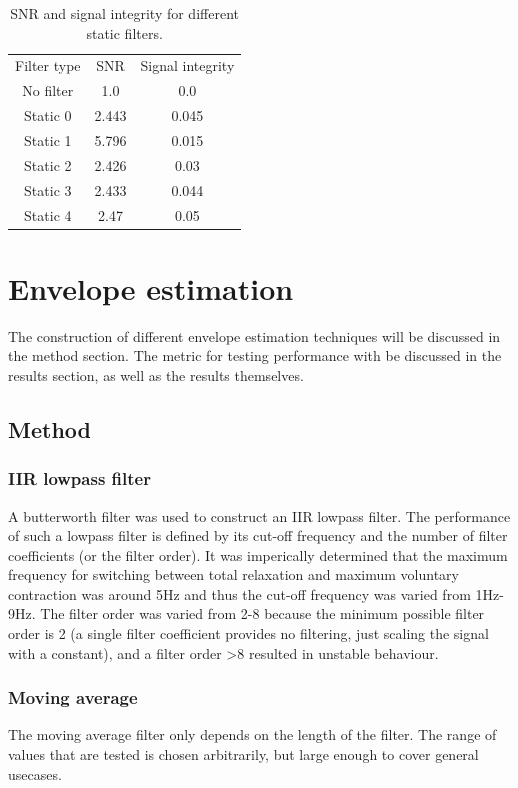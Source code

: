 \begin{table} [h!]
    \begin{tabular}{c|c|c}
        Filter type & SNR & Signal integrity\\
        No filter & 1.0 & 0.0\\
        Static 0 & 2.443 & 0.045\\
        Static 1 & 5.796 & 0.015\\
        Static 2 & 2.426 & 0.03\\
        Static 3 & 2.433 & 0.044\\
        Static 4 & 2.47 & 0.05\\
    \end{tabular}
    \caption{SNR and signal integrity for different static filters.}
    \label{tab:static_filter_snr_integrity}
\end{table}

\section{Envelope estimation}
The construction of different envelope estimation techniques will be discussed in the method section. The metric for testing performance with be discussed in the results section, as well as the results themselves.

\subsection{Method}
\subsubsection{IIR lowpass filter}
A butterworth filter was used to construct an IIR lowpass filter. The performance of such a lowpass filter is defined by its cut-off frequency and the number of filter coefficients (or the filter order). It was imperically determined that the maximum frequency for switching between total relaxation and maximum voluntary contraction was around 5Hz and thus the cut-off frequency was varied from 1Hz-9Hz. The filter order was varied from 2-8 because the minimum possible filter order is 2 (a single filter coefficient provides no filtering, just scaling the signal with a constant), and a filter order >8 resulted in unstable behaviour.

\subsubsection{Moving average}
The moving average filter only depends on the length of the filter. The range of values that are tested is chosen arbitrarily, but large enough to cover general usecases.

